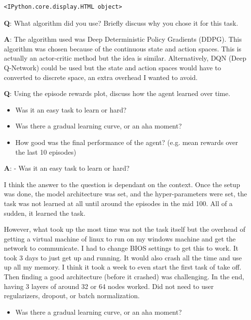 \documentclass[11pt]{article}
\providecommand{\tightlist}{%
      \setlength{\itemsep}{0pt}\setlength{\parskip}{0pt}}
\begin{document}
    
    \begin{verbatim}
<IPython.core.display.HTML object>
    \end{verbatim}

    
    \textbf{Q}: What algorithm did you use? Briefly discuss why you chose it
for this task.

\textbf{A}: The algorithm used was Deep Deterministic Policy Gradients
(DDPG). This algorithm was chosen because of the continuous state and
action spaces. This is actually an actor-critic method but the idea is
similar. Alternatively, DQN (Deep Q-Network) could be used but the state
and action spaces would have to converted to discrete space, an extra
overhead I wanted to avoid.

\textbf{Q}: Using the episode rewards plot, discuss how the agent
learned over time.

\begin{itemize}
\tightlist
\item
  Was it an easy task to learn or hard?
\item
  Was there a gradual learning curve, or an aha moment?
\item
  How good was the final performance of the agent? (e.g. mean rewards
  over the last 10 episodes)
\end{itemize}

\textbf{A}: - Was it an easy task to learn or hard?

I think the answer to the question is dependant on the context. Once the
setup was done, the model architecture was set, and the hyper-parameters
were set, the task was not learned at all until around the episodes in
the mid 100. All of a sudden, it learned the task.

However, what took up the most time was not the task itself but the
overhead of getting a virtual machine of linux to run on my windows
machine and get the network to communicate. I had to change BIOS
settings to get this to work. It took 3 days to just get up and running.
It would also crash all the time and use up all my memory. I think it
took a week to even start the first task of take off. Then finding a
good architecture (before it crashed) was challenging. In the end,
having 3 layers of around 32 or 64 nodes worked. Did not need to user
regularizers, dropout, or batch normalization.

\begin{itemize}
\tightlist
\item
  Was there a gradual learning curve, or an aha moment?
\end{itemize}
\end{document}
